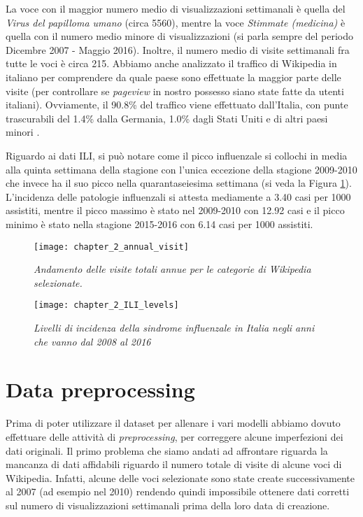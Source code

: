 La voce con il maggior numero medio di visualizzazioni settimanali è quella del \textit{Virus del papilloma umano} (circa 
5560), mentre la voce \textit{Stimmate (medicina)} è quella con il numero medio minore di visualizzazioni (si parla sempre 
del periodo Dicembre 2007 - Maggio 2016). Inoltre, il numero medio di visite settimanali fra tutte le voci è circa 215. 
Abbiamo anche analizzato il traffico di Wikipedia in italiano per comprendere da quale paese sono effettuate la maggior parte 
delle visite (per controllare se \textit{pageview} in nostro possesso siano state fatte da utenti italiani). 
Ovviamente, il 90.8\% del traffico viene effettuato dall'Italia, con punte trascurabili del 1.4\% dalla Germania, 1.0\% dagli 
Stati Uniti e di altri paesi minori \cite{WikipediaStatsCountry}.
\bigskip

Riguardo ai dati ILI, si può notare come il picco influenzale si collochi in media alla quinta settimana della stagione con 
l'unica eccezione della stagione 2009-2010 che invece ha il suo picco nella quarantaseiesima settimana (si veda la 
Figura \ref{fig:ch_2_ILI_levels}). L'incidenza delle patologie influenzali si attesta mediamente a 3.40 casi per 1000 
assistiti, mentre il picco massimo è stato nel 2009-2010 con 12.92 casi e il picco minimo è stato nella stagione 2015-2016 
con 6.14 casi per 1000 assistiti.
\bigskip

\begin{figure}[h!]

\texttt{[image: chapter\_2\_annual\_visit]}
\caption{\textit{Andamento delle visite totali annue per le categorie di Wikipedia selezionate.}}
\label{fig:ch_2_annual_visit}


\texttt{[image: chapter\_2\_ILI\_levels]}
\caption{\textit{Livelli di incidenza della sindrome influenzale in Italia negli anni che vanno dal 2008 al 2016}}
\label{fig:ch_2_ILI_levels}

\centering

\end{figure}
\bigskip

\section{Data preprocessing}
\bigskip

Prima di poter utilizzare il dataset per allenare i vari modelli abbiamo dovuto effettuare delle attività di 
\textit{preprocessing}, per correggere alcune imperfezioni dei dati originali. Il primo problema che siamo andati ad 
affrontare riguarda la mancanza di dati affidabili riguardo il numero totale di visite di alcune voci di Wikipedia.
Infatti, alcune delle voci selezionate sono state create successivamente al 2007 (ad esempio nel 2010) rendendo quindi 
impossibile ottenere dati corretti sul numero di visualizzazioni settimanali prima della loro data di creazione. 
\bigskip

